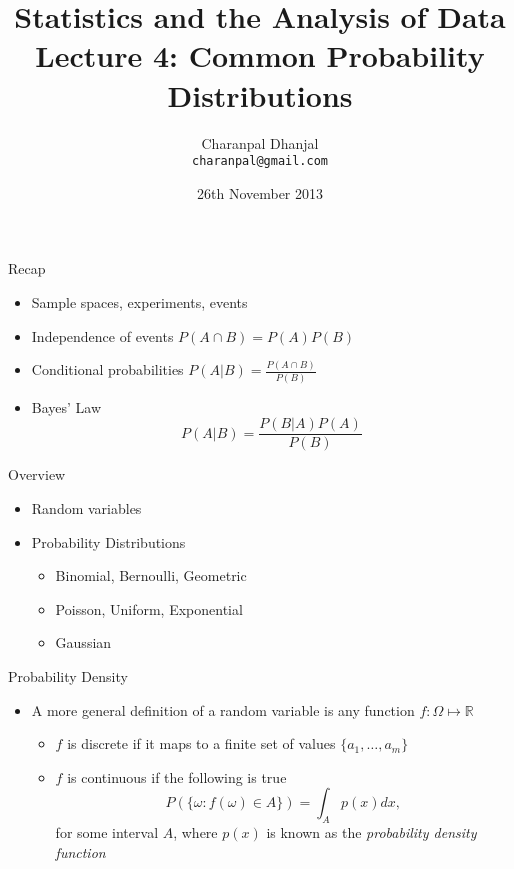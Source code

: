 \documentclass{beamer}
\title{Statistics and the Analysis of Data\\ Lecture 4: Common Probability Distributions}
\author{Charanpal Dhanjal \\ \texttt{charanpal@gmail.com}}
\institute{\'{E}cole des Ponts}
\date{26th November 2013}
\begin{document}
\frame{\titlepage}


\begin{frame}{Recap}  
\begin{itemize} 
\item Sample spaces, experiments, events 
\item Independence of events   $P(A \cap B) = P(A)P(B)$
\item Conditional probabilities  $P(A | B) = \frac{P(A \cap B)}{P(B)}$
\item Bayes' Law 
\begin{displaymath}
 P(A | B) = \frac{P(B | A)P(A)}{P(B)}
\end{displaymath}
\end{itemize}
\end{frame}

\begin{frame}{Overview}
\begin{itemize} 
\item Random variables 
\item Probability Distributions
\begin{itemize}
\item Binomial, Bernoulli, Geometric 
\item Poisson, Uniform, Exponential 
\item Gaussian  
\end{itemize}  
\end{itemize}
\end{frame}

\begin{frame}{Probability Density} 
\begin{itemize} 
 \item A more general definition of a random variable is any function $f: \Omega \mapsto \mathbb{R}$ 
\begin{itemize} 
\item $f$ is discrete if it maps to a finite set of values $\{a_1, \ldots, a_m\}$
\item $f$ is continuous if the following is true 
\begin{displaymath} 
P(\{\omega: f(\omega) \in A\}) = \int_{A} p(x) dx, 
\end{displaymath}
for some interval $A$, where $p(x)$ is known as the \emph{probability density function} 
 \end{itemize}
 \end{itemize}
\end{frame}
\end{document}

